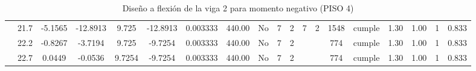\begin{table}[H]
{\begin{tabular}{|c|c|c|c|c|c|r|c|c|c|c|c|c|c|c|c|c|c|c|}
\cline{2-19}        & 21.7 & -5.1565 & -12.8913 & 9.725 & -12.8913 & 0.003333 & 440.00 & No  & 7   & 2   & 7   & 2   & 1548 & \cellcolor[rgb]{ .776,  .937,  .808}cumple & 1.30 & 1.00 & 1   & 0.833 \bigstrut\\
\cline{2-19}        & 22.2 & -0.8267 & -3.7194 & 9.725 & -9.7254 & 0.003333 & 440.00 & No  & 7   & 2   &     &     & 774 & \cellcolor[rgb]{ .776,  .937,  .808}cumple & 1.30 & 1.00 & 1   & 0.833 \bigstrut\\
\cline{2-19}        & 22.7 & 0.0449 & -0.0536 & 9.7254 & -9.7254 & 0.003333 & 440.00 & No  & 7   & 2   &     &     & 774 & \cellcolor[rgb]{ .776,  .937,  .808}cumple & 1.30 & 1.00 & 1   & 0.833 \bigstrut\\
    \hline
    \end{tabular}%
  }
      \caption{Diseño a flexión de la viga 2 para momento negativo (PISO 4) }
  \label{tab:F VG2 P4 M-}%
\end{table}%
